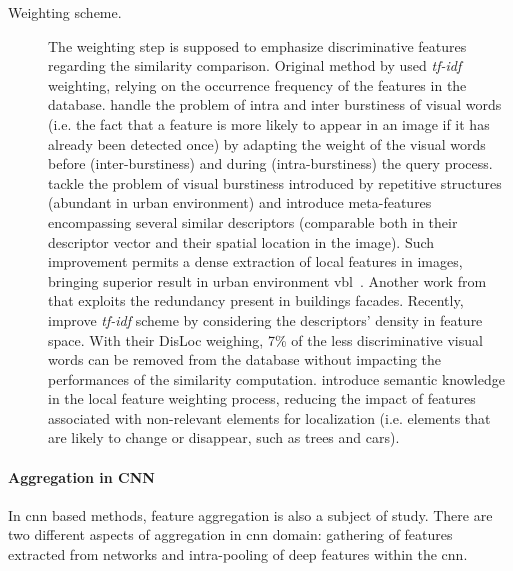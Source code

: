 \begin{description}
		    \item[Weighting scheme.] The weighting step is supposed to emphasize discriminative features regarding the similarity comparison.	Original method by \citep{Sivic2003} used \textit{tf-idf} weighting, relying on the occurrence frequency of the features in the database. \citet{Jegou2009} handle the problem of intra and inter burstiness of visual words (i.e. the fact that a feature is more likely to appear in an image if it has already been detected once) by adapting the weight of the visual words before (inter-burstiness) and during (intra-burstiness) the query process. \citet{Torii2013} tackle the problem of visual burstiness introduced by repetitive structures (abundant in urban environment) and introduce meta-features encompassing several similar descriptors (comparable both in their descriptor vector and their spatial location in the image). Such improvement permits a dense extraction of local features in images, bringing superior result in urban environment \ac{vbl}~\citep{Qu2016,Torii2015}. Another work from \citet{Morago2016} that exploits the redundancy present in buildings facades. Recently, \citet{Arandjelovic2014} improve \textit{tf-idf} scheme by considering the descriptors' density in feature space. With their DisLoc weighing, 7\% of the less discriminative visual words can be removed from the database without impacting the performances of the similarity computation. \citet{Mousavian2015} introduce semantic knowledge in the local feature weighting process, reducing the impact of features associated with non-relevant elements for localization (i.e. elements that are likely to change or disappear, such as trees and cars).
	       \end{description}
				
		\paragraph{Aggregation in CNN}
		
			\label{subsubsec:cnn_aggregation}
			In \ac{cnn} based methods, feature aggregation is also a subject of study. There are two different aspects of aggregation in \ac{cnn} domain: gathering of features extracted from networks and intra-pooling of deep features within the \ac{cnn}.

